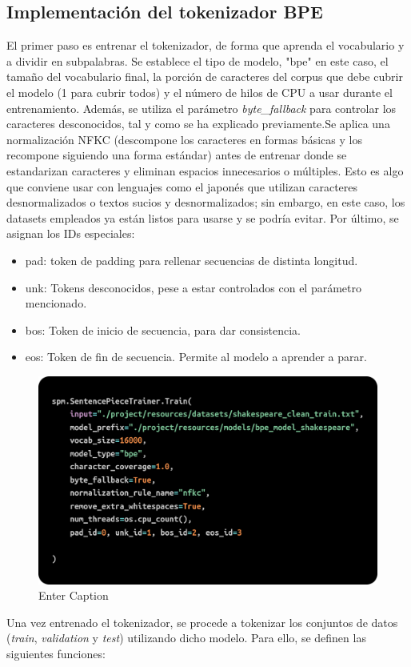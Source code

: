 \documentclass[11pt]{book}
\theoremstyle{plain}
\theoremstyle{definition}
\begin{document}
\subsection{Implementación del tokenizador BPE}
 El primer paso es entrenar el tokenizador, de forma que aprenda el vocabulario y a dividir en subpalabras. Se establece el tipo de modelo, "bpe" en este caso, el tamaño del vocabulario final, la porción de caracteres del corpus que debe cubrir el modelo (1 para cubrir todos) y el número de hilos de CPU a usar durante el entrenamiento. Además, se utiliza el parámetro \textit{byte\_fallback} para controlar los caracteres desconocidos, tal y como se ha explicado previamente.Se aplica una normalización NFKC (descompone los caracteres en formas básicas y los recompone siguiendo una forma estándar) antes de entrenar donde se estandarizan caracteres y eliminan espacios innecesarios o múltiples. Esto es algo que conviene usar con lenguajes como el japonés que utilizan caracteres desnormalizados o textos sucios y desnormalizados; sin embargo, en este caso, los datasets empleados ya están listos para usarse y se podría evitar. Por último, se asignan los IDs especiales: \\
 \begin{itemize}
     \item pad: token de padding para rellenar secuencias de distinta longitud.
     \item unk: Tokens desconocidos, pese a estar controlados con el parámetro mencionado.
     \item bos: Token de inicio de secuencia, para dar consistencia.
     \item eos: Token de fin de secuencia. Permite al modelo a aprender a parar.
 \end{itemize}
\begin{figure}[h]
    \centering
    \includegraphics[width=0.5\linewidth]{img/sentence_trainer.png}
    \caption{Enter Caption}
    \label{fig:placeholder3}
\end{figure}
 
Una vez entrenado el tokenizador, se procede a tokenizar los conjuntos de datos (\textit{train}, \textit{validation} y \textit{test}) utilizando dicho modelo. Para ello, se definen las siguientes funciones:
\end{document}
